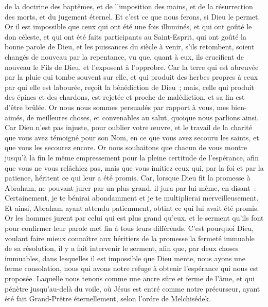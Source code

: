 \begin{multicols}{2}
de la doctrine des baptêmes, et de l'imposition des mains, et de la résurrection des morts, et du jugement éternel.
Et c'est ce que nous ferons, si Dieu le permet.
Or il est impossible que ceux qui ont été une fois illuminés, et qui ont goûté le don céleste, et qui ont été faits participants au Saint-Esprit,
qui ont goûté la bonne parole de Dieu, et les puissances du siècle à venir,
s'ils retombent, soient changés de nouveau par la repentance, vu que, quant à eux, ils crucifient de nouveau le Fils de Dieu, et l'exposent à l'opprobre.
Car la terre qui est abreuvée par la pluie qui tombe souvent sur elle, et qui produit des herbes propres à ceux par qui elle est labourée, reçoit la bénédiction de Dieu~;
mais, celle qui produit des épines et des chardons, est rejetée et proche de malédiction, et sa fin est d'être brûlée.
Or nous nous sommes persuadés par rapport à vous, mes bien-aimés, de meilleures choses, et convenables au salut, quoique nous parlions ainsi.
Car Dieu n'est pas injuste, pour oublier votre œuvre, et le travail de la charité que vous avez témoigné pour son Nom, en ce que vous avez secouru les saints, et que vous les secourez encore.
Or nous souhaitons que chacun de vous montre jusqu'à la fin le même empressement pour la pleine certitude de l'espérance,
afin que vous ne vous relâchiez pas, mais que vous imitiez ceux qui, par la foi et par la patience, héritent ce qui leur a été promis.
Car, lorsque Dieu fit la promesse à Abraham, ne pouvant jurer par un plus grand, il jura par lui-même,
en disant~: Certainement, je te bénirai abondamment et je te multiplierai merveilleusement.
Et ainsi, Abraham ayant attendu patiemment, obtint ce qui lui avait été promis.
Or les hommes jurent par celui qui est plus grand qu'eux, et le serment qu'ils font pour confirmer leur parole met fin à tous leurs différends.
C'est pourquoi Dieu, voulant faire mieux connaître aux héritiers de la promesse la fermeté immuable de sa résolution, il y a fait intervenir le serment,
afin que, par deux choses immuables, dans lesquelles il est impossible que Dieu mente, nous ayons une ferme consolation, nous qui avons notre refuge à obtenir l'espérance qui nous est proposée.
Laquelle nous tenons comme une ancre sûre et ferme de l'âme, et qui pénètre jusqu'au-delà du voile,
où Jésus est entré comme notre précurseur, ayant été fait Grand-Prêtre éternellement, selon l'ordre de Melchisédek.

\end{multicols}
